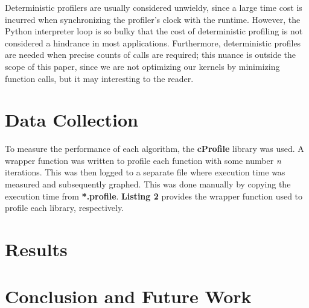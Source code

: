 \documentclass[12pt]{article}
\begin{document}
Deterministic profilers are usually considered unwieldy, since a large time cost is incurred when synchronizing the profiler's clock with the runtime. However, the Python interpreter loop is so bulky that the cost of deterministic profiling is not considered a hindrance in most applications. Furthermore, deterministic profiles are needed when precise counts of calls are required; this nuance is outside the scope of this paper, since we are not optimizing our kernels by minimizing function calls, but it may interesting to the reader.

\section{Data Collection}
To measure the performance of each algorithm, the \textbf{cProfile} library was used. A wrapper function was written to profile each function with some number \textit{n} iterations. This was then logged to a separate file where execution time was measured and subsequently graphed. This was done manually by copying the execution time from \textbf{*.profile}. \textbf{Listing 2} provides the wrapper function used to profile each library, respectively.
\hfill\break



\section{Results}

\section{Conclusion and Future Work}

\newpage


\end{document}
